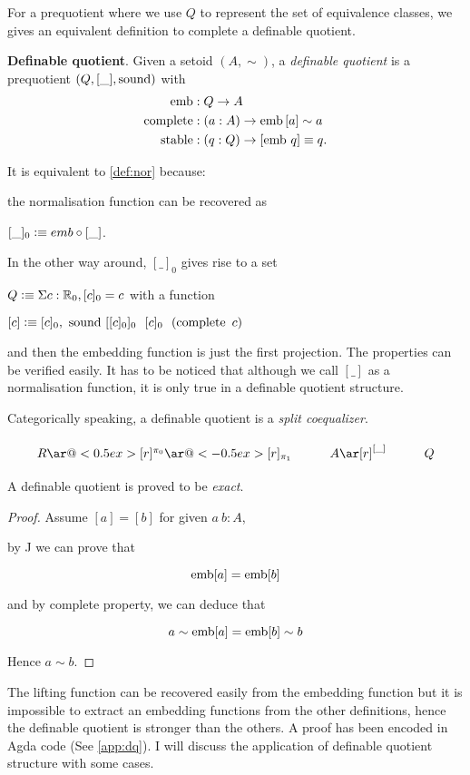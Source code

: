 For a prequotient where we use $Q$ to represent the set of equivalence classes, we gives an equivalent definition to complete a definable quotient.

\begin{definition} \textbf{Definable quotient}.
\noindent
Given a setoid $(A,\sim)$, a \emph{definable quotient} is a
prequotient $(Q, [\_], \operatorname{sound})$ with 
\begin{align*}
\operatorname{emb} &: Q \rightarrow A\\
\operatorname{complete} &: (a : A) \rightarrow \operatorname{emb} {[a]} \sim a\\
\operatorname{stable} &: (q:Q) \rightarrow [\operatorname{emb}\,q] \equiv q.
\end{align*}
\end{definition}

It is equivalent to \autoref{def:nor} because:

the normalisation function can be recovered as 

$[\_]_0 \vcentcolon\equiv emb \circ [\_]$. 

In the other way around, $[\_]_0$ gives rise to a set 

$Q \vcentcolon\equiv \Sigma c : \mathbb{R}_0, [ c ]_0 = c$ with a function 

$[ c ] \vcentcolon\equiv [c]_0 , ~\operatorname{sound} ~ [[c]_0]_0 ~~ [c]_0~~ (\operatorname{complete} ~ c)$

 and then the embedding function is just the first projection. The properties can be verified easily. It has to be noticed that although we call $[\_]$ as a normalisation function, it is only true in a definable quotient structure.

Categorically speaking, a definable quotient is a \emph{split coequalizer}.

\[\xymatrix{
R\ar@<0.5ex>[r]^{\pi_0}\ar@<-0.5ex>[r]_{\pi_1}& A\ar[r]^{[\_]}
& Q
}\]

A definable quotient is proved to be \emph{exact}.

\begin{proof}
Assume $[ a ] = [ b ]$ for given $a ~b : A$,

by J we can prove that

$$\operatorname{emb} [ a ] = \operatorname{emb} [ b ]$$

and by complete property, we can deduce that

$$a \sim \operatorname{emb} [ a ] = \operatorname{emb} [ b ] \sim b$$

Hence $a \sim b$.
\end{proof}

The lifting function can be recovered easily from the embedding function but it is impossible to extract an embedding functions from the other definitions, hence the definable quotient is stronger than the others. A proof has been encoded in Agda code (See \autoref{app:dq}). I will discuss the application of definable quotient structure with some cases.

